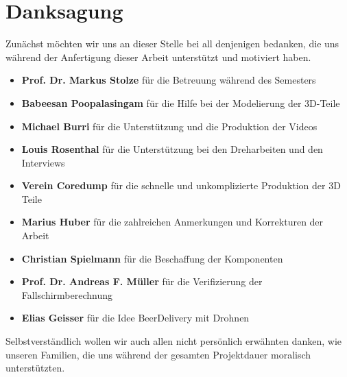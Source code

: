 \newpage
{}
\chapter*{Danksagung}
Zunächst möchten wir uns an dieser Stelle bei all denjenigen bedanken, die uns während der Anfertigung dieser Arbeit unterstützt und motiviert haben.
\begin{itemize}
	\item{\textbf{Prof. Dr. Markus Stolze} für die Betreuung während des Semesters}
	\item{\textbf{Babeesan Poopalasingam} für die Hilfe bei der Modelierung der 3D-Teile}
	\item{\textbf{Michael Burri} für die Unterstützung und die Produktion der Videos}
	\item{\textbf{Louis Rosenthal} für die Unterstützung bei den Dreharbeiten und den Interviews}
	\item{\textbf{Verein Coredump} für die schnelle und unkomplizierte Produktion der 3D Teile}
	\item{\textbf{Marius Huber} für die zahlreichen Anmerkungen und Korrekturen  der Arbeit}
    \item{\textbf{Christian Spielmann} für die Beschaffung der Komponenten}
	\item{\textbf{Prof. Dr. Andreas F. Müller} für die Verifizierung der Fallschirmberechnung}
	\item{\textbf{Elias Geisser} für die Idee BeerDelivery mit Drohnen}	
\end{itemize}
Selbstverständlich wollen wir auch allen nicht persönlich erwähnten danken, wie unseren Familien, die uns während der gesamten Projektdauer moralisch unterstützten.